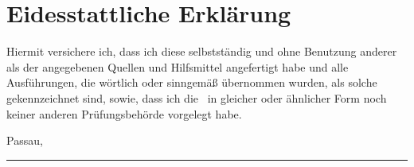 
\chapter{Eidesstattliche Erkl\"arung}

	Hiermit versichere ich, dass ich diese \thesisType{} selbstst\"andig und ohne Benutzung anderer als der angegebenen Quellen und Hilfsmittel angefertigt habe und alle Ausf\"uhrungen, die w\"ortlich oder sinngem\"a\ss{} übernommen wurden, als solche gekennzeichnet sind, sowie, dass ich die \thesisType ~in gleicher oder \"ahnlicher Form noch keiner anderen Pr\"ufungsbeh\"orde vorgelegt habe.

	\vspace{3cm}

	Passau, \thedate

	\vspace{2cm}

	\parbox{8cm}{
		\hrule \strut \theauthor
	}

